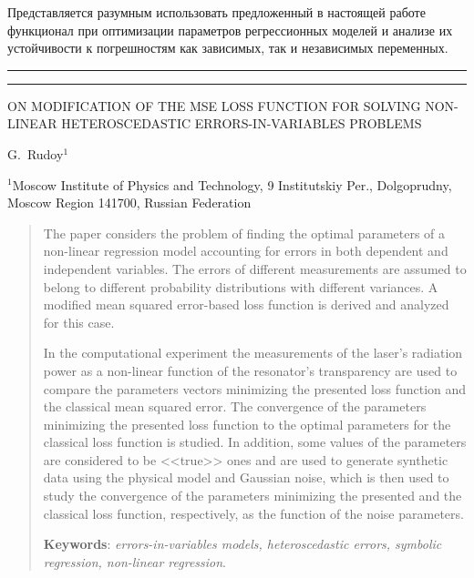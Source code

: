 \documentclass[tikz,10pt,a4paper]{article}
\begin{document}
Представляется разумным использовать предложенный в настоящей работе функционал
при оптимизации параметров регрессионных моделей и анализе их
устойчивости к погрешностям как зависимых, так и независимых
переменных\cite{Rudoy15MonteCarlo,Rudoy16StabilityAnalysis}.

\FloatBarrier




\begin{center}
  \rule{\textwidth}{1pt}
  \rule{\textwidth}{1pt}
\end{center}

\begin{center}
  \uppercase{On modification of the MSE loss function for solving non-linear heteroscedastic errors-in-variables problems}

  \bigskip
  G.~Rudoy$^1$
\end{center}

$^1$Moscow Institute of Physics and Technology, 9 Institutskiy Per.,
Dolgoprudny, Moscow Region 141700, Russian Federation

\renewcommand{\abstractname}{Abstract}

\begin{abstract}
  The paper considers the problem of finding the optimal parameters of a
  non-linear regression model accounting for errors in both dependent and
  independent variables. The errors of different measurements are assumed to
  belong to different probability distributions with different variances.
  A modified mean squared error-based loss function is derived and analyzed
  for this case.

  In the computational experiment the measurements of the laser's radiation
  power as a non-linear function of the resonator's transparency are used to
  compare the parameters vectors minimizing the presented
  loss function and the classical mean squared error.
  The convergence of the parameters minimizing the presented loss function
  to the optimal parameters for the classical loss function is studied.
  In addition, some values of the parameters are considered to be <<true>>
  ones and are used to generate synthetic data using the physical model and
  Gaussian noise, which is then used to study the convergence of the parameters
  minimizing the presented and the classical loss function, respectively, as
  the function of the noise parameters.

  \textbf{Keywords}: \emph{errors-in-variables models, heteroscedastic errors,
  symbolic regression, non-linear regression}.
\end{abstract}
\end{document}
